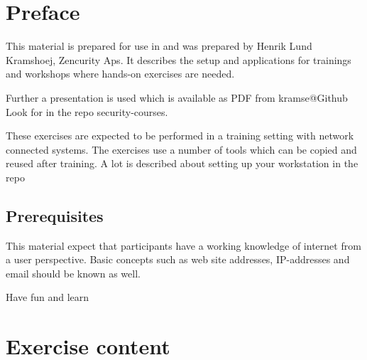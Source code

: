 \documentclass[a4paper,11pt,notitlepage]{report}
\begin{document}
\rm
{}

\newcommand{\course}[1]{System Integration F2020}


\setcounter{tocdepth}{0}

\normal

{\color{titlecolor}\tableofcontents}

\normal
\pagestyle{fancyplain}
\chapter*{\color{titlecolor}Preface}

This material is prepared for use in \emph{\course} and was prepared by
Henrik Lund Kramshoej, Zencurity Aps.
It describes the setup and
applications for trainings and workshops where hands-on exercises are needed.

\vskip 1cm
Further a presentation is used which is available as PDF from kramse@Github\\
Look for \jobname in the repo security-courses.

These exercises are expected to be performed in a training setting with network
connected systems. The exercises use a number of tools which can be copied and
reused after training. A lot is described about setting up your workstation in
the repo


\section*{\color{titlecolor}Prerequisites}

This material expect that participants have a working knowledge of internet from
a user perspective. Basic concepts such as web site addresses, IP-addresses and
email should be known as well.

\vskip 1cm
Have fun and learn
\eject

\rhead{\fancyplain{}{\bf \chaptername\ \thechapter}}


\chapter*{\color{titlecolor}Exercise content}
\end{document}
